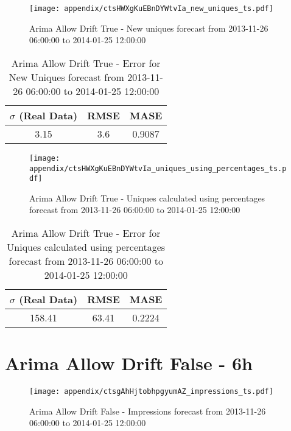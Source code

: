 \begin{figure}[H] \begin{center} \leavevmode
\texttt{[image: appendix/ctsHWXgKuEBnDYWtvIa\_new\_uniques\_ts.pdf]} \caption[]{
Arima Allow Drift True - New uniques forecast from 2013-11-26 06:00:00 to 2014-01-25 12:00:00} \label{fig:appendix/ctsHWXgKuEBnDYWtvIa_new_uniques_ts.pdf} \end{center}
\end{figure}

\begin{table}[H]
\centering
\footnotesize
\begin{tabular}{ccc}
$\sigma$ (Real Data) & RMSE & MASE   \\ \hline
3.15 & 3.6 & 0.9087 \\
\end{tabular}

\vspace{0.5cm}

\caption[]{
Arima Allow Drift True - Error for New Uniques forecast from 2013-11-26 06:00:00 to 2014-01-25 12:00:00}
\end{table}

\begin{figure}[H] \begin{center} \leavevmode
\texttt{[image: appendix/ctsHWXgKuEBnDYWtvIa\_uniques\_using\_percentages\_ts.pdf]} \caption[]{
Arima Allow Drift True - Uniques calculated using percentages forecast from 2013-11-26 06:00:00 to 2014-01-25 12:00:00} \label{fig:appendix/ctsHWXgKuEBnDYWtvIa_uniques_using_percentages_ts.pdf} \end{center}
\end{figure}

\begin{table}[H]
\centering
\footnotesize
\begin{tabular}{ccc}
$\sigma$ (Real Data) & RMSE & MASE   \\ \hline
158.41 & 63.41 & 0.2224 \\
\end{tabular}

\vspace{0.5cm}

\caption[]{
Arima Allow Drift True - Error for Uniques calculated using percentages forecast from 2013-11-26 06:00:00 to 2014-01-25 12:00:00}
\end{table}

\section{Arima Allow Drift False - 6h}
\begin{figure}[H] \begin{center} \leavevmode
\texttt{[image: appendix/ctsgAhHjtobhpgyumAZ\_impressions\_ts.pdf]} \caption[]{
Arima Allow Drift False - Impressions forecast from 2013-11-26 06:00:00 to 2014-01-25 12:00:00} \label{fig:appendix/ctsgAhHjtobhpgyumAZ_impressions_ts.pdf} \end{center}
\end{figure}

